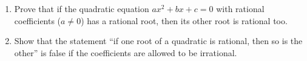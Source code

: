 \begin{enumerate}
\item[(a)] Prove that if the quadratic equation $ax^2+bx+c=0$ with rational coefficients ($a\ne0$) has a rational root, then its other root is rational too.
\item[(b)] Show that the statement ``if one root of a quadratic is rational, then so is the other'' is false if the coefficients are allowed to be irrational.
\end{enumerate}
